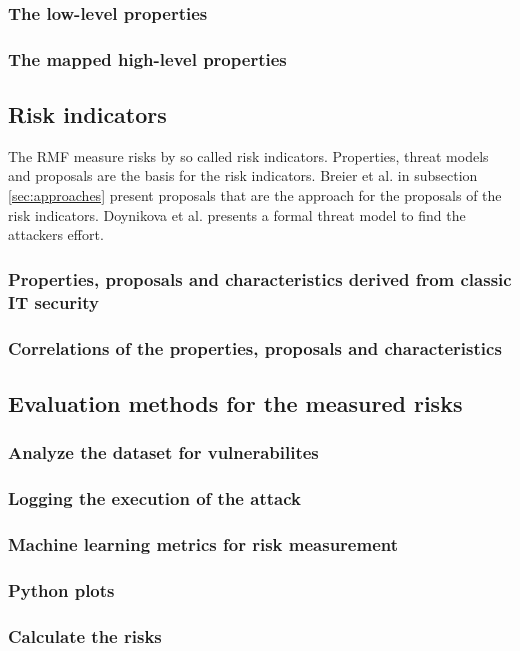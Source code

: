 \subsubsection*{The low-level properties}


\subsubsection*{The mapped high-level properties}


\subsection{Risk indicators}
\label{sec:risk_indicators}

The RMF measure risks by so called risk indicators. Properties, threat models and proposals are the basis for the risk indicators. Breier et al. in subsection \ref{sec:approaches} present
proposals that are the approach for the proposals of the risk indicators. Doynikova et al. presents a formal threat model to find the attackers effort.

\subsubsection*{Properties, proposals and characteristics derived from classic IT security}


\subsubsection*{Correlations of the properties, proposals and characteristics}


\subsection{Evaluation methods for the measured risks}


\subsubsection*{Analyze the dataset for vulnerabilites}


\subsubsection*{Logging the execution of the attack}


\subsubsection*{Machine learning metrics for risk measurement}


\subsubsection*{Python plots}


\subsubsection*{Calculate the risks}

